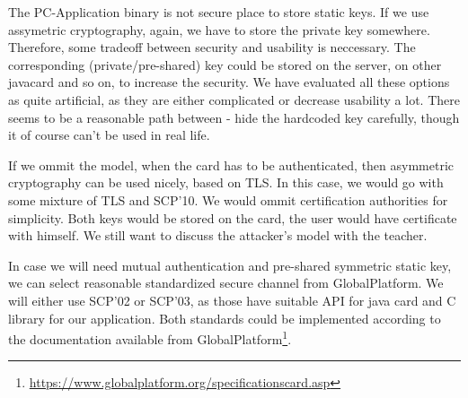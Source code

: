 \documentclass[12pt,a4paper]{article}
\begin{document}
The PC-Application binary is not secure place to store static keys. If we use assymetric cryptography, again, we have to store the private key somewhere. 
Therefore, some tradeoff between security and usability is neccessary. The corresponding (private/pre-shared) key could be stored on the server, on other javacard and so on, to increase the security. We have evaluated all these options as quite artificial, as they are either complicated or decrease usability a lot. There seems to be a reasonable path between - hide the hardcoded key carefully, though it of course can't be used in real life. 

If we ommit the model, when the card has to be authenticated, then asymmetric cryptography can be used nicely, based on TLS. In this case, we would go with some mixture of TLS and SCP'10. We would ommit certification authorities for simplicity. Both keys would be stored on the card, the user would have certificate with himself.  We still want to discuss the attacker's model with the teacher.

In case we will need mutual authentication and pre-shared symmetric static key, we can select reasonable standardized secure channel from GlobalPlatform. We will either use SCP'02 or SCP'03, as those have suitable API for java card and C library for our application. Both standards could be implemented according to the documentation available from GlobalPlatform\footnote{\url{https://www.globalplatform.org/specificationscard.asp}}.







 
\end{document}
